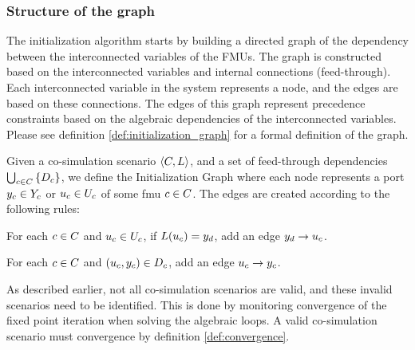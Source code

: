 \subsubsection{Structure of the graph}
The initialization algorithm starts by building a directed graph of the dependency between the interconnected variables of the FMUs. The graph is constructed based on the interconnected variables and internal connections (feed-through). Each interconnected variable in the system represents a node, and the edges are based on these connections. The edges of this graph represent precedence constraints based on the algebraic dependencies of the interconnected variables. Please see definition \ref{def:initialization_graph} for a formal definition of the graph.

\begin{definition}\label{def:initialization_graph}
  Given a co-simulation scenario $ \left\langle C, L \right\rangle $, and a set of feed-through dependencies $\bigcup_{c \in C}  \left\{ D_{c} \right\}$, we define the Initialization Graph where each node represents a port $y_{c} \in Y_{c}$ or $u_{c} \in U_{c}$ of some fmu $c \in C$. The edges are created according to the following rules:
  \begin{compactenum}
    \item For each $c \in C$ and $u_{c} \in U_{c}$, if $L(u_{c}) = y_{d}$, add an edge $y_{d} -> u_{c}$.
    \item For each $c \in C$ and $(u_{c},y_{c}) \in D_{c}$, add an edge $u_{c} -> y_{c}$.
  \end{compactenum}
\end{definition}

As described earlier, not all co-simulation scenarios are valid, and these invalid scenarios need to be identified. This is done by monitoring convergence of the fixed point iteration when solving the algebraic loops. A valid co-simulation scenario must convergence by definition \ref{def:convergence}.

